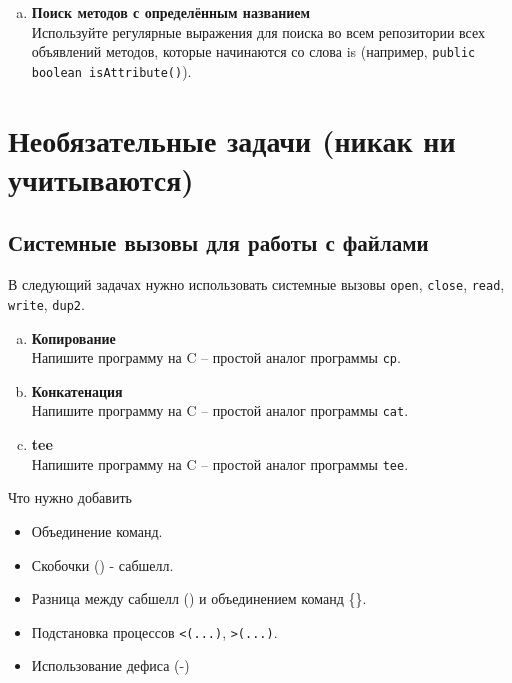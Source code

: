 \documentclass{article}
\begin{document}
\begin{enumerate}[a.]
 
\item \textbf{Поиск методов с определённым названием}\\
Используйте регулярные выражения для поиска во всем репозитории всех объявлений методов, которые начинаются со слова is (например, \texttt{public boolean isAttribute()}).




\end{enumerate}


\newpage
\section{Необязательные задачи (никак ни учитываются)}
\subsection{Системные вызовы для работы с файлами}
В следующий задачах нужно использовать системные вызовы \texttt{open}, \texttt{close}, \texttt{read}, \texttt{write}, \texttt{dup2}.
\begin{enumerate}[a.]
\item \textbf{Копирование}\\
Напишите программу на C -- простой аналог программы \texttt{cp}.
\item \textbf{Конкатенация}\\
Напишите программу на C -- простой аналог программы \texttt{cat}.
\item \textbf{tee}\\
Напишите программу на C -- простой аналог программы \texttt{tee}.
\end{enumerate}


\newpage
Что нужно добавить
\begin{itemize}
\item  Объединение команд.
\item  Скобочки () - сабшелл.
\item Разница между сабшелл () и объединением команд \{\}.
\item  Подстановка процессов \texttt{<(...)}, \texttt{>(...)}.
\item  Использование дефиса (-)
\end{itemize}
\end{document}
